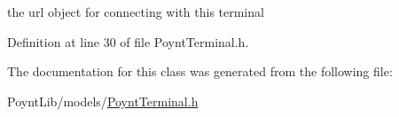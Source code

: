 the url object for connecting with this terminal 



Definition at line 30 of file Poynt\+Terminal.\+h.



The documentation for this class was generated from the following file\+:\begin{DoxyCompactItemize}
\item 
Poynt\+Lib/models/\hyperlink{_poynt_terminal_8h}{Poynt\+Terminal.\+h}\end{DoxyCompactItemize}
